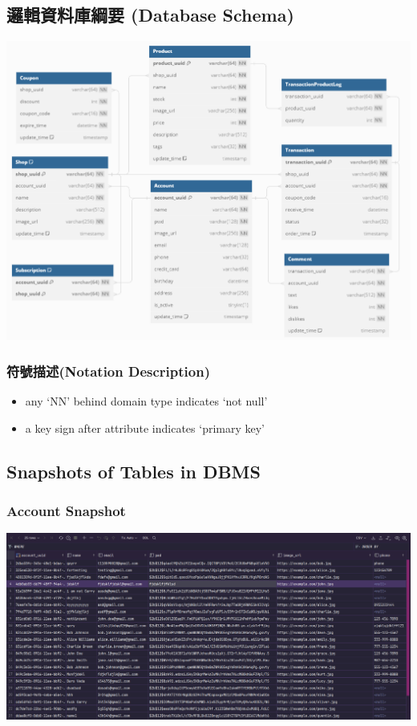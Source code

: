 \documentclass[a4paper, 12pt]{article}
\begin{document}
\subsection{邏輯資料庫綱要 (Database Schema)}
\includegraphics[scale=0.7]{image/nft_database_schema.png}
\subsubsection{符號描述(Notation Description)}
\begin{itemize}
    \item any `NN' behind domain type indicates `not null'
    \item a key sign after attribute indicates `primary key'
\end{itemize}
\subsection{Snapshots of Tables in DBMS}
\subsubsection{Account Snapshot}
\includegraphics[scale=0.4]{snapshots/account.png}
\end{document}
